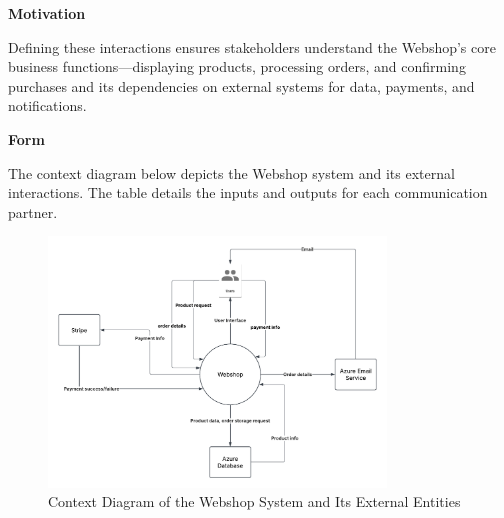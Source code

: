\textbf{Motivation}

Defining these interactions ensures stakeholders understand the Webshop’s core business functions—displaying products, processing orders, and confirming purchases and its dependencies on external systems for data, payments, and notifications.

\textbf{Form}

The context diagram below depicts the Webshop system and its external interactions. The table details the inputs and outputs for each communication partner.

\begin{figure}[h]
  \centering
  \includegraphics[width=0.8\textwidth]{images/webshop_context_diagram.pdf} 
  \caption{Context Diagram of the Webshop System and Its External Entities}
  \label{fig:webshop-context}
\end{figure}

\begin{table}[h]
  \centering
  \caption{Inputs and Outputs for Webshop Communication Partners}
  \label{tab:webshop-business-context}
\end{table}

